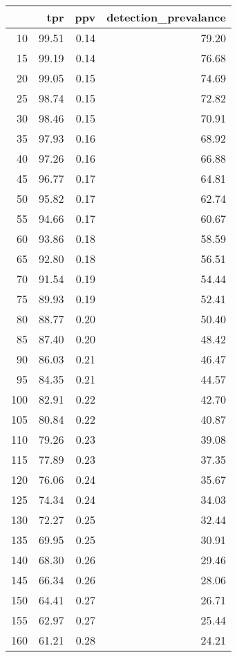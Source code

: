 \begin{table}[ht]
\centering
\begin{tabular}{rrrr}
  \hline
 & tpr & ppv & detection\_prevalance \\ 
  \hline
  10 & 99.51 & 0.14 & 79.20 \\ 
    15 & 99.19 & 0.14 & 76.68 \\ 
    20 & 99.05 & 0.15 & 74.69 \\ 
    25 & 98.74 & 0.15 & 72.82 \\ 
    30 & 98.46 & 0.15 & 70.91 \\ 
    35 & 97.93 & 0.16 & 68.92 \\ 
    40 & 97.26 & 0.16 & 66.88 \\ 
    45 & 96.77 & 0.17 & 64.81 \\ 
    50 & 95.82 & 0.17 & 62.74 \\ 
    55 & 94.66 & 0.17 & 60.67 \\ 
    60 & 93.86 & 0.18 & 58.59 \\ 
    65 & 92.80 & 0.18 & 56.51 \\ 
    70 & 91.54 & 0.19 & 54.44 \\ 
    75 & 89.93 & 0.19 & 52.41 \\ 
    80 & 88.77 & 0.20 & 50.40 \\ 
    85 & 87.40 & 0.20 & 48.42 \\ 
    90 & 86.03 & 0.21 & 46.47 \\ 
    95 & 84.35 & 0.21 & 44.57 \\ 
   100 & 82.91 & 0.22 & 42.70 \\ 
   105 & 80.84 & 0.22 & 40.87 \\ 
   110 & 79.26 & 0.23 & 39.08 \\ 
   115 & 77.89 & 0.23 & 37.35 \\ 
   120 & 76.06 & 0.24 & 35.67 \\ 
   125 & 74.34 & 0.24 & 34.03 \\ 
   130 & 72.27 & 0.25 & 32.44 \\ 
   135 & 69.95 & 0.25 & 30.91 \\ 
   140 & 68.30 & 0.26 & 29.46 \\ 
   145 & 66.34 & 0.26 & 28.06 \\ 
   150 & 64.41 & 0.27 & 26.71 \\ 
   155 & 62.97 & 0.27 & 25.44 \\ 
   160 & 61.21 & 0.28 & 24.21 \\ 

\end{tabular}
\end{table}
